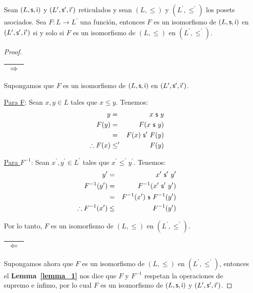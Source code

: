   \begin{lemma} \label{lemma_7}
    \PN Sean $(L, \mathsf{s}, \mathsf{i})$ y $(L^{\prime}, \mathsf{s}^{\prime}, \mathsf{i}^{\prime})$ reticulados y sean $(L, \leq)$ y $(L^{\prime}, \leq^{\prime})$ los posets asociados.
    Sea $F: L \rightarrow L^{\prime}$ una función, entonces $F$ es un isomorfismo de $(L, \mathsf{s}, \mathsf{i})$ en $ (L^{\prime}, \mathsf{s}^{\prime}, \mathsf{i}^{\prime})$ si y solo si
    $F$ es un isomorfismo de $(L, \leq)$ en $(L^{\prime}, \leq^{\prime})$.
  \end{lemma}
  \begin{proof}
    \PN \begin{tabular}{|c|} \hline $\Rightarrow$ \\\hline \end{tabular} Supongamos que $F$ es un isomorfismo de
    $(L, \mathsf{s}, \mathsf{i})$ en $ (L^{\prime}, \mathsf{s}^{\prime}, \mathsf{i}^{\prime})$.

    \PN \underline{Para F}: Sean $x, y \in L$ tales que $x \leq y$. Tenemos:
    \begin{eqnarray*}
      y &=& x \ \mathsf{s} \ y \\
      F(y) &=& F(x \ \mathsf{s} \ y) \\
      &=& F(x) \ \mathsf{s}^{\prime} \ F(y) \\
      \therefore F(x) &\leq^{\prime}& F(y)
    \end{eqnarray*}

    \PN \underline{Para $F^{-1}$}: Sean $x^{\prime}, y^{\prime} \in L^{\prime}$ tales que $x^{\prime} \leq^{\prime}
    y^{\prime}$. Tenemos:
    \begin{eqnarray*}
      y^{\prime} &=& x^{\prime} \ \SU^{\prime} \ y^{\prime} \\
      F^{-1}(y^{\prime}) &=& F^{-1}(x^{\prime} \ \SU^{\prime} \ y^{\prime}) \\
      &=& F^{-1}(x^{\prime}) \ \SU \ F^{-1}(y^{\prime}) \\
      \therefore F^{-1}(x^{\prime}) &\leq& F^{-1}(y^{\prime})
    \end{eqnarray*}

    \PN Por lo tanto, $F$ es un isomorfismo de $(L, \leq)$ en $(L^{\prime}, \leq^{\prime})$.

    \PN \begin{tabular}{|c|} \hline $\Leftarrow$ \\\hline \end{tabular} Supongamos ahora que $F$ es un isomorfismo
    de $(L, \leq)$ en $(L^{\prime}, \leq^{\prime})$, entonces el \textbf{Lemma~\ref{lemma_1}} nos dice que $F$ y
    $F^{-1}$ respetan la operaciones de supremo e ínfimo, por lo cual $F$ es un isomorfismo de $(L, \mathsf{s}, \mathsf{i})$ y
    $(L^{\prime}, \mathsf{s}^{\prime}, \mathsf{i}^{\prime})$.
  \end{proof}

